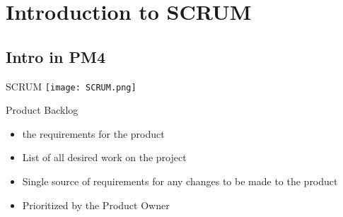 \section{Introduction to SCRUM}

\subsection{Intro in PM4}

\begin{concept}{SCRUM}
    \texttt{[image: SCRUM.png]}
\end{concept}

\begin{definition}{Product Backlog}
    \begin{itemize}
        \item the requirements for the product
        \item List of all desired work on the project
        \item Single source of requirements for any changes to be made to the product
        \item Prioritized by the Product Owner
    \end{itemize}
    
\end{definition}